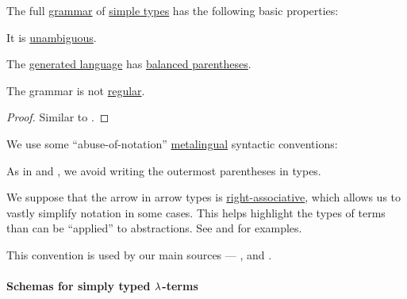 \begin{proposition}\label{thm:simple_type_grammar}
  The full \hyperref[def:formal_grammar]{grammar} of \hyperref[def:simple_type]{simple types} has the following basic properties:
  \begin{thmenum}
     It is \hyperref[def:grammar_ambiguity]{unambiguous}.

     The \hyperref[def:formal_grammar/language]{generated language} has \hyperref[def:paired_delimiters]{balanced parentheses}.

     The grammar is not \hyperref[def:chomsky_hierarchy/regular]{regular}.
  \end{thmenum}
\end{proposition}
\begin{proof}
  Similar to .
\end{proof}

\begin{remark}\label{rem:simple_type_parentheses}
  We use some \enquote{abuse-of-notation} \hyperref[con:metalogic]{metalingual} syntactic conventions:
  \begin{thmenum}
     As in  and , we avoid writing the outermost parentheses in types.

     We suppose that the arrow in arrow types is \hyperref[rem:binary_operation_syntax_trees/associativity]{right-associative}, which allows us to vastly simplify notation in some cases. This helps highlight the types of terms than can be \enquote{applied} to abstractions. See  and  for examples.

    This convention is used by our main sources --- ,  and .
  \end{thmenum}
\end{remark}

\paragraph{Schemas for simply typed \( \mathrm{\lambda} \)-terms}\hfill

